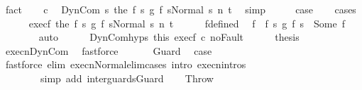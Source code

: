 \begin{isabellebody}
\ fact\isanewline
\ \ \isamarkupfalse%
\ c\ \isamarkupfalse%
\ {\isachardoublequoteopen}{\isasymGamma}{\isasymturnstile}{\isasymlangle}DynCom\ {\isacharparenleft}{\isasymlambda}s{\isachardot}\ the\ {\isacharparenleft}{\isacharparenleft}f{}\ s{\isacharparenright}\ {\isasyminter}\isactrlsub g\ {\isacharparenleft}f{}\ s{\isacharparenright}{\isacharparenright}{\isacharparenright}{\isacharcomma}Normal\ s{\isasymrangle}\ {\isacharequal}n{\isasymRightarrow}\ t{\isachardoublequoteclose}\ \isamarkupfalse%
\ simp\isanewline
\ \ \isamarkupfalse%
\ \isamarkupfalse%
\ {\isacharquery}case\isanewline
\ \ \isamarkupfalse%
\ {\isacharparenleft}cases{\isacharparenright}\isanewline
\ \ \ \ \isamarkupfalse%
\ exec{\isacharunderscore}f{\isacharcolon}\ {\isachardoublequoteopen}{\isasymGamma}{\isasymturnstile}{\isasymlangle}the\ {\isacharparenleft}f{}\ s\ {\isasyminter}\isactrlsub g\ f{}\ s{\isacharparenright}{\isacharcomma}Normal\ s{\isasymrangle}\ {\isacharequal}n{\isasymRightarrow}\ t{\isachardoublequoteclose}\isanewline
\ \ \ \ \isamarkupfalse%
\ f{\isacharunderscore}defined\ \isamarkupfalse%
\ f\ \ {\isachardoublequoteopen}{\isacharparenleft}f{}\ s\ {\isasyminter}\isactrlsub g\ f{}\ s{\isacharparenright}\ {\isacharequal}\ Some\ f{\isachardoublequoteclose}\isanewline
\ \ \ \ \ \ \isamarkupfalse%
\ auto\isanewline
\ \ \ \ \isamarkupfalse%
\ DynCom{\isachardot}hyps\ this\ exec{\isacharunderscore}f\ c{}\ noFault\isanewline
\ \ \ \ \isamarkupfalse%
\ {\isacharquery}thesis\isanewline
\ \ \ \ \ \ \isamarkupfalse%
\ execn{\isachardot}DynCom\ \isamarkupfalse%
\ fastforce\isanewline
\ \ \isamarkupfalse%
\isanewline
{}\isamarkupfalse%
\isanewline
\ \ \isamarkupfalse%
\ Guard\ \isamarkupfalse%
\ {\isacharquery}case\ \isanewline
\ \ \ \ \isamarkupfalse%
\ {\isacharparenleft}fastforce\ elim{\isacharcolon}\ execn{\isacharunderscore}Normal{\isacharunderscore}elim{\isacharunderscore}cases\ intro{\isacharcolon}\ execn{\isachardot}intros\ \isanewline
\ \ \ \ \ \ \ \ simp\ add{\isacharcolon}\ inter{\isacharunderscore}guards{\isacharunderscore}Guard{\isacharparenright}\isanewline
{}\isamarkupfalse%
\isanewline
\ \ \isamarkupfalse%
\ Throw\ \isamarkupfalse%

\end{isabellebody}
